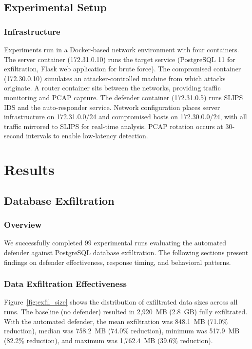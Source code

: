 \subsection{Experimental Setup}

\subsubsection{Infrastructure}

Experiments run in a Docker-based network environment with four containers. The server container (172.31.0.10) runs the target service (PostgreSQL 11 for exfiltration, Flask web application for brute force). The compromised container (172.30.0.10) simulates an attacker-controlled machine from which attacks originate. A router container sits between the networks, providing traffic monitoring and PCAP capture. The defender container (172.31.0.5) runs SLIPS IDS and the auto-responder service. Network configuration places server infrastructure on 172.31.0.0/24 and compromised hosts on 172.30.0.0/24, with all traffic mirrored to SLIPS for real-time analysis. PCAP rotation occurs at 30-second intervals to enable low-latency detection.




\section{Results}

\subsection{Database Exfiltration}

\subsubsection{Overview}

We successfully completed 99 experimental runs evaluating the automated defender against PostgreSQL database exfiltration. The following sections present findings on defender effectiveness, response timing, and behavioral patterns.

\subsubsection{Data Exfiltration Effectiveness}

Figure~\ref{fig:exfil_size} shows the distribution of exfiltrated data sizes across all runs. The baseline (no defender) resulted in 2,920~MB (2.8~GB) fully exfiltrated. With the automated defender, the mean exfiltration was 848.1~MB (71.0\% reduction), median was 758.2~MB (74.0\% reduction), minimum was 517.9~MB (82.2\% reduction), and maximum was 1,762.4~MB (39.6\% reduction).

